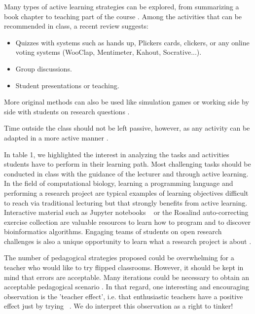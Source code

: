 \documentclass[10pt,letterpaper]{article}
\begin{document}
Many types of active learning strategies can be explored, from summarizing a book chapter to teaching part of the course \cite{fiorella_eight_2016}. Among the activities that can be recommended in class, a recent review \cite{delozier_flipped_2017} suggests:

\begin{itemize}

\item Quizzes with systems such as hands up, Plickers cards, clickers, 
or any online voting systems (WooClap, Mentimeter, Kahout, Socrative...).

\item Group discussions.

\item Student presentations or teaching.

\end{itemize}


More original methods can also be used like simulation games \cite{taly2019molecular} or working side by side 
with students on research questions \cite{mazzanti2017can}. 

Time outside the class should not be left passive, 
however, as any activity can be adapted in a more active manner \cite{chi_icap_2014}.

In table 1, we highlighted the interest in analyzing the tasks and activities students have to perform in their learning path. 
Most challenging tasks should be conducted in class with the guidance of the lecturer and through active learning. 
In the field of computational biology, learning a programming language and performing a research project are typical examples 
of learning objectives difficult to reach via traditional lecturing but that strongly benefits from active learning. 
Interactive material such as Jupyter notebooks ~\cite{davies_using_2020,rule_ten_2019} or the Rosalind auto-correcting
exercise collection \cite{compeau_bioinformatics_2018} are valuable resources to learn how to program
and to discover bioinformatics algorithms.
Engaging teams of students on open research challenges is also a unique opportunity to learn what a research project is about \cite{abdollahi2018meet}.

The number of pedagogical strategies proposed could be overwhelming for a teacher who would like to try flipped classrooms. 
However, it should be kept in mind that errors are acceptable. 
Many iterations could be necessary to obtain an acceptable pedagogical scenario \cite{compeau_establishing_2019}. 
In that regard, one interesting and encouraging observation is the 'teacher effect', 
i.e. that enthusiastic teachers have a positive effect just by trying ~\cite{hattie_visible_2008}. 
We do interpret this observation as a right to tinker!
\end{document}

